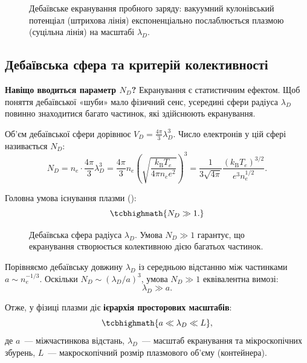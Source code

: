 \begin{figure}[htbp]\centering
	\caption{Дебаївське екранування пробного заряду: вакуумний кулонівський потенціал (штрихова лінія) експоненціально послаблюється плазмою (суцільна лінія) на масштабі $\lambda_D$.}\label{fig:debye-screening}
\end{figure}

\subsection{Дебаївська сфера та критерій колективності}

\textbf{Навіщо вводиться параметр $N_D$?}
Екранування є статистичним ефектом. Щоб поняття дебаївської «шуби» мало фізичний сенс, усередині сфери радіуса $\lambda_D$ повинно знаходитися багато частинок, які здійснюють екранування.

Об'єм дебаївської сфери дорівнює $V_D = \frac{4\pi}{3}\lambda_D^3$. Число електронів у цій сфері називається  $N_D$:
\begin{equation}
	N_D = n_e \cdot \frac{4\pi}{3}\lambda_D^3 = \frac{4\pi}{3} n_e \left(\sqrt{\frac{k_{\mathrm B}T_e}{4\pi n_e e^2}}\right)^3 = \frac{1}{3\sqrt{4\pi}} \frac{(k_{\mathrm B}T_e)^{3/2}}{e^3 n_e^{1/2}}.
\end{equation}

Головна умова існування плазми ():
\begin{equation}
	\tcbhighmath{N_D \gg 1.}
\end{equation}

\begin{figure}\centering
	\caption{Дебаївська сфера радіуса $\lambda_D$. Умова $N_D \gg 1$ гарантує, що екранування створюється колективною дією багатьох частинок.}\label{fig:debye-sphere}
\end{figure}

Порівняємо дебаївську довжину $\lambda_D$ із середньою відстанню між частинками $a \sim n_e^{-1/3}$. Оскільки $N_D \sim (\lambda_D / a)^3$, умова $N_D \gg 1$ еквівалентна вимозі:
\begin{equation}
	\lambda_D \gg a.
\end{equation}

Отже, у фізиці плазми діє \textbf{ієрархія просторових масштабів}:
\begin{equation}
	\tcbhighmath{a \ll \lambda_D \ll L},
\end{equation}
де $a$~--- міжчастинкова відстань, $\lambda_D$~--- масштаб екранування та мікроскопічних збурень, $L$~--- макроскопічний розмір плазмового об'єму (контейнера).

